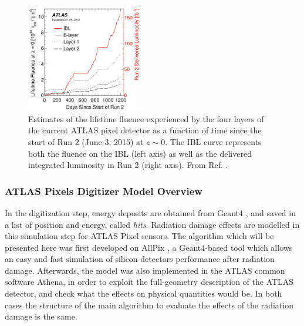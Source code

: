 \begin{figure}[!htb]
\centering
\includegraphics[width=0.45\textwidth]{figures/SensorSimulation/lorentz.png}
\caption{Estimates of the lifetime fluence experienced by the four layers of the current ATLAS pixel detector as a function of time since the start of Run 2 (June 3, 2015) at $z \sim 0$. The IBL curve represents both the fluence on the IBL (left axis) as well as the delivered integrated luminosity in Run 2 (right axis). From Ref. \cite{PixelLumiAndFLuence}.}
\label{fig:LumiVsFluence}
\end{figure}


\subsubsection{ATLAS Pixels Digitizer Model Overview}
\label{sec:digMod}
In the digitization step, energy deposits are obtained from Geant4 \cite{GEANT4}, and saved in a list of position and energy, called \textit{hits}. Radiation damage effects are modelled  in this simulation step for ATLAS Pixel sensors. The 
algorithm which will be presented here was first developed on AllPix \cite{software:Allpix}, a Geant4-based tool which allows an easy and fast simulation of silicon detectors performance after radiation damage. Afterwards, the model was also implemented in the ATLAS common software Athena, in order to exploit the full-geometry description of the ATLAS detector, and check what the effects on physical quantities would be. In both cases the structure of the main algorithm to evaluate the effects of the radiation damage is the same. \\

